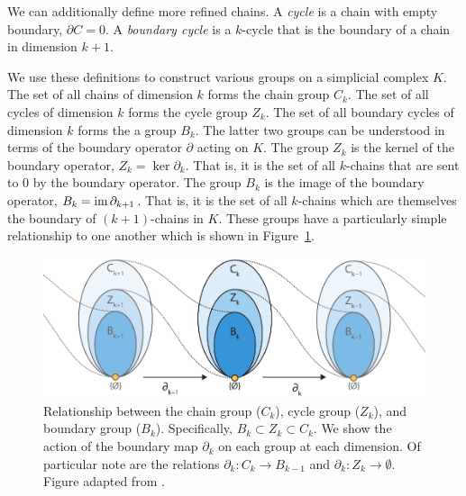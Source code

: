 We can additionally define more refined chains.
A \emph{cycle} is a chain with empty boundary, $\partial C=0$.
A \emph{boundary cycle} is a $k$-cycle that is the boundary of a chain in dimension $k+1$.

We use these definitions to construct various groups on a simplicial complex $K$.
The set of all chains of dimension $k$ forms the chain group $C_{k}$.
The set of all cycles of dimension $k$ forms the cycle group $Z_{k}$.
The set of all boundary cycles of dimension $k$ forms the a group $B_{k}$.
The latter two groups can be understood in terms of the boundary operator $\partial$ acting on $K$.
The group $Z_{k}$ is the kernel of the boundary operator, $Z_{k}=\ker\partial_{k}$.
That is, it is the set of all $k$-chains that are sent to $0$ by the boundary operator.
The group $B_{k}$ is the image of the boundary operator, $B_{k}=\operatorname{im}\partial_{k+1}$.
That is, it is the set of all $k$-chains which are themselves the boundary of $(k+1)$-chains in $K$.
These groups have a particularly simple relationship to one another which is shown in Figure~\ref{fig:bg:chain_complex_maps}.



\begin{figure}
\centering
\includegraphics[]{fig/background/chain_complex_maps.pdf}
\caption[Relationship between the chain group, cycle group, and boundary group]{Relationship between the chain group ($C_k$), cycle group ($Z_k$), and boundary group ($B_k$). Specifically, $B_{k} \subset Z_{k} \subset C_{k}$. We show the action of the boundary map $\partial_k$ on each group at each dimension. Of particular note are the relations $\partial_{k} : C_{k} \rightarrow B_{k-1}$ and $\partial_{k} : Z_{k} \rightarrow \emptyset$. Figure adapted from \cite{Fasy:2014}.}
\label{fig:bg:chain_complex_maps}
\end{figure}

